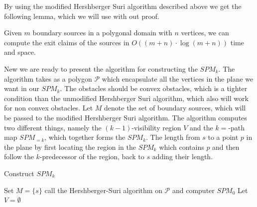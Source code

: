 By using the modified Hershberger Suri algorithm described above we get the following lemma, which we will use with out proof.

\begin{Lemma}
Given $m$ boundary sources in a polygonal domain with $n$ vertices, we can compute the exit claims of the sources in $O((m + n) \cdot \log
(m + n))$ time and space.
\end{Lemma}

New we are ready to present the algorithm for constructing the $SPM_k$. The algorithm takes as a polygon $\mathcal{P}$ which encapsulate all 
the vertices in the plane we want in our $SPM_k$. The obstacles should be convex obstacles, which is a tighter condition than the unmodified 
Hershberger Suri algorithm, which also will work for non convex obstacles. Let $M$ denote the set of boundary sources, which will be 
passed to the modified Hershberger Suri algorithm. The algorithm computes two different things, namely the $(k-1)$-visibility region $V$ 
and the $k=$-path map $SPM_{=k}$, which together forms the $SPM_k$. The length from $s$ to a point $p$ in the plane by first locating the 
region in the $SPM_k$ which contains $p$ and then follow the $k$-predecessor of the region, back to $s$  adding their length.

\begin{algorithm}[H]
	\caption{Construct $SPM_k$} \label{algorithm:constructspmk}
	\begin{algorithmic}[1]
	    \State Set $M=\{s\}$
	    \State call the Hershberger-Suri algorithm on $\mathcal{P}$ and computer $SPM_0$
	    \State Let $V = \emptyset$
		    \State {}
            \State {}
            \Else 
            \EndIf
            \State {}
        \EndFor
        \State {}
	\end{algorithmic} 
\end{algorithm}

